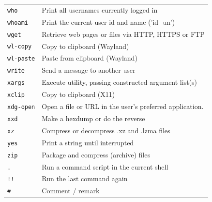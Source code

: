 \begin{longtable}{ll}
\texttt{who}         & Print all usernames currently logged in \\
\texttt{whoami}      & Print the current user id and name ('id -un') \\
\texttt{wget}        & Retrieve web pages or files via HTTP, HTTPS or FTP \\
\texttt{wl-copy}     & Copy to clipboard (Wayland) \\
\texttt{wl-paste}    & Paste from clipboard (Wayland) \\
\texttt{write}       & Send a message to another user \\
\hline
\texttt{xargs}       & Execute utility, passing constructed argument list(s) \\
\texttt{xclip}       & Copy to clipboard (X11) \\
\texttt{xdg-open}    & Open a file or URL in the user's preferred application. \\
\texttt{xxd}         & Make a hexdump or do the reverse \\
\texttt{xz}          & Compress or decompress .xz and .lzma files \\
\hline
\texttt{yes}         & Print a string until interrupted \\
\hline
\texttt{zip}         & Package and compress (archive) files \\
\texttt{.}           & Run a command script in the current shell \\
\texttt{!!}          & Run the last command again \\
\texttt{\#}          & Comment / remark \\
\hline
\end{longtable}